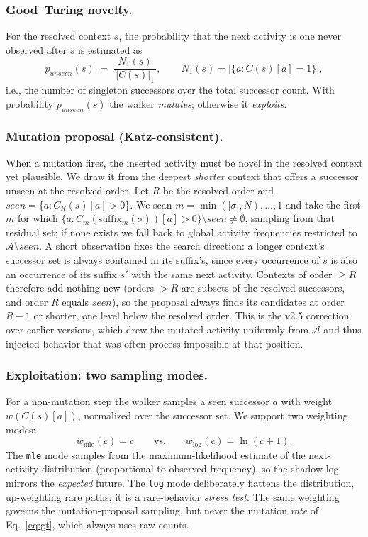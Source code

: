 \documentclass[runningheads]{llncs}
\newcommand{\punseen}{\ensuremath{p_{\mathit{unseen}}}}
\begin{document}
\subsubsection{Good--Turing novelty.}
For the resolved context $s$, the probability that the next activity is one never observed after $s$ is estimated as
\begin{equation}
\punseen(s) \;=\; \frac{N_1(s)}{\,|C(s)|_1\,}, \qquad N_1(s) = |\{a : C(s)[a]=1\}|,
\label{eq:gt}
\end{equation}
i.e., the number of singleton successors over the total successor count. With probability $\punseen(s)$ the walker \emph{mutates}; otherwise it \emph{exploits}.

\subsubsection{Mutation proposal (Katz-consistent).}
When a mutation fires, the inserted activity must be novel in the resolved context yet plausible. We draw it from the deepest \emph{shorter} context that offers a successor unseen at the resolved order. Let $R$ be the resolved order and $\mathit{seen}=\{a:C_R(s)[a]>0\}$. We scan $m=\min(|\sigma|,N),\dots,1$ and take the first $m$ for which $\{a:C_m(\mathrm{suffix}_m(\sigma))[a]>0\}\setminus\mathit{seen}\neq\emptyset$, sampling from that residual set; if none exists we fall back to global activity frequencies restricted to $\mathcal{A}\setminus\mathit{seen}$. A short observation fixes the search direction: a longer context's successor set is always contained in its suffix's, since every occurrence of $s$ is also an occurrence of its suffix $s'$ with the same next activity. Contexts of order $\ge R$ therefore add nothing new (orders $>R$ are subsets of the resolved successors, and order $R$ equals $\mathit{seen}$), so the proposal always finds its candidates at order $R{-}1$ or shorter, one level below the resolved order. This is the v2.5 correction over earlier versions, which drew the mutated activity uniformly from $\mathcal{A}$ and thus injected behavior that was often process-impossible at that position.

\subsubsection{Exploitation: two sampling modes.}
For a non-mutation step the walker samples a seen successor $a$ with weight $w(C(s)[a])$, normalized over the successor set. We support two weighting modes:
\begin{equation}
w_{\mathrm{mle}}(c)=c \qquad\text{vs.}\qquad w_{\mathrm{log}}(c)=\ln(c+1).
\end{equation}
The \texttt{mle} mode samples from the maximum-likelihood estimate of the next-activity distribution (proportional to observed frequency), so the shadow log mirrors the \emph{expected} future. The \texttt{log} mode deliberately flattens the distribution, up-weighting rare paths; it is a rare-behavior \emph{stress test}. The same weighting governs the mutation-proposal sampling, but never the mutation \emph{rate} of Eq.~\eqref{eq:gt}, which always uses raw counts.
\end{document}
